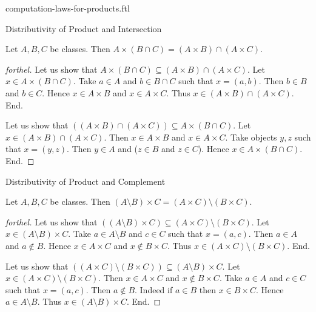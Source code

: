 \documentclass{naproche-library}
\begin{document}
\begin{smodule}[title=Computation Laws for Cartesian Products]{computation-laws-for-products.ftl}
\begin{sfragment}{Distributivity of Product and Intersection}
  \begin{proposition}[forthel,id=FOUNDATIONS_05_954964241285120]
    Let $A, B, C$ be classes.
    Then $A \times (B \cap C) = (A \times B) \cap (A \times C)$.
  \end{proposition}
  \begin{proof}[forthel]
    Let us show that $A \times (B \cap C) \subseteq (A \times B) \cap (A \times C)$.
      Let $x \in A \times (B \cap C)$.
      Take $a \in A$ and $b \in B \cap C$ such that $x = (a, b)$.
      Then $b \in B$ and $b \in C$.
      Hence $x \in A \times B$ and $x \in A \times C$.
      Thus $x \in (A \times B) \cap (A \times C)$.
    End.

    Let us show that $((A \times B) \cap (A \times C)) \subseteq A \times (B \cap C)$. %
      Let $x \in (A \times B) \cap (A \times C)$.
      Then $x \in A \times B$ and $x \in A \times C$.
      Take objects $y, z$ such that $x = (y, z)$.
      Then $y \in A$ and ($z \in B$ and $z \in C$).
      Hence $x \in A \times (B \cap C)$.
    End.
  \end{proof}
\end{sfragment}

\begin{sfragment}{Distributivity of Product and Complement}
  \begin{proposition}[forthel,id=FOUNDATIONS_05_6495329908162560]
    Let $A, B, C$ be classes.
    Then $(A \setminus B) \times C = (A \times C) \setminus (B \times C)$.
  \end{proposition}
  \begin{proof}[forthel]
    Let us show that $((A \setminus B) \times C) \subseteq (A \times C) \setminus (B \times C).$ %
      Let $x \in (A \setminus B) \times C$.
      Take $a \in A \setminus B$ and $c \in C$ such that $x = (a, c)$.
      Then $a \in A$ and $a \notin B$.
      Hence $x \in A \times C$ and $x \notin B \times C$.
      Thus $x \in (A \times C) \setminus (B \times C)$.
    End.

    Let us show that $((A \times C) \setminus (B \times C)) \subseteq (A \setminus B) \times C$. %
      Let $x \in (A \times C) \setminus (B \times C)$.
      Then $x \in A \times C$ and $x \notin B \times C$.
      Take $a \in A$ and $c \in C$ such that $x = (a, c)$.
      Then $a \notin B$.
      Indeed if $a \in B$ then $x \in B \times C$.
      Hence $a \in A \setminus B$.
      Thus $x \in (A \setminus B) \times C$.
    End.
  \end{proof}


\end{sfragment}
\end{smodule}
\end{document}
